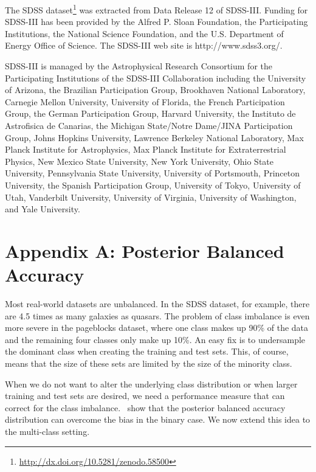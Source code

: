 \documentclass[fleqn,10pt,lineno]{wlpeerj} %
\begin{document}
The SDSS dataset\footnote{\url{http://dx.doi.org/10.5281/zenodo.58500}} was
extracted from Data Release 12 of SDSS-III. Funding for SDSS-III has been
provided by the Alfred P. Sloan Foundation, the Participating Institutions, the
National Science Foundation, and the U.S. Department of Energy Office of
Science. The SDSS-III web site is http://www.sdss3.org/.

SDSS-III is managed by the Astrophysical Research Consortium for the
Participating Institutions of the SDSS-III Collaboration including the
University of Arizona, the Brazilian Participation Group, Brookhaven National
Laboratory, Carnegie Mellon University, University of Florida, the French
Participation Group, the German Participation Group, Harvard University, the
Instituto de Astrofisica de Canarias, the Michigan State/Notre Dame/JINA
Participation Group, Johns Hopkins University, Lawrence Berkeley National
Laboratory, Max Planck Institute for Astrophysics, Max Planck Institute for
Extraterrestrial Physics, New Mexico State University, New York University,
Ohio State University, Pennsylvania State University, University of Portsmouth,
Princeton University, the Spanish Participation Group, University of Tokyo,
University of Utah, Vanderbilt University, University of Virginia, University
of Washington, and Yale University.





\pagebreak

\section*{Appendix A: Posterior Balanced Accuracy}


Most real-world datasets are unbalanced. In the SDSS dataset, for example,
there are 4.5 times as many galaxies as quasars. The problem of class imbalance
is even more severe in the pageblocks dataset, where one class makes up 90\% of
the data and the remaining four classes only make up 10\%. An easy fix is to
undersample the dominant class when creating the training and test sets. This,
of course, means that the size of these sets are limited by the size of the
minority class.

When we do not want to alter the underlying class distribution or when larger
training and test sets are desired, we need a performance measure that can
correct for the class imbalance.~\cite{brodersen10} show that the posterior
balanced accuracy distribution can overcome the bias in the binary case. We now
extend this idea to the multi-class setting.
\end{document}
